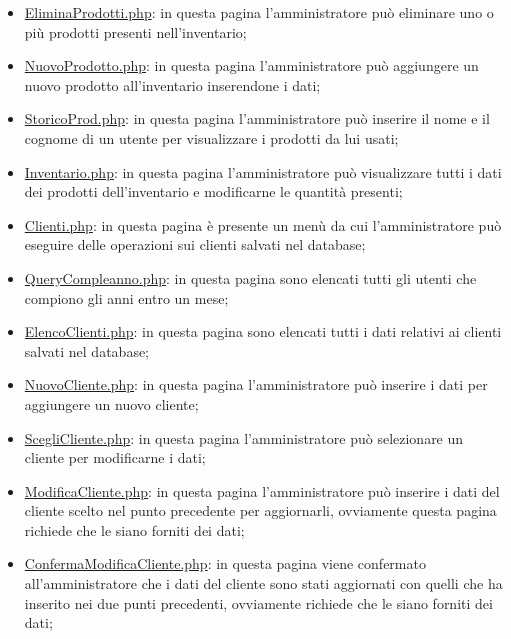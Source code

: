 {\begin{itemize}
		\item \href{http://tecweb2016.studenti.math.unipd.it/smarches/EliminaProdotti.php}{EliminaProdotti.php}: in questa pagina l'amministratore può eliminare uno o più prodotti presenti nell'inventario;
		\item \href{http://tecweb2016.studenti.math.unipd.it/smarches/NuovoProdotto.php}{NuovoProdotto.php}: in questa pagina l'amministratore può aggiungere un nuovo prodotto all'inventario inserendone i dati;
		\item \href{http://tecweb2016.studenti.math.unipd.it/smarches/StoricoProd.php}{StoricoProd.php}: in questa pagina l'amministratore può inserire il nome e il cognome di un utente per visualizzare i prodotti da lui usati;
		\item \href{http://tecweb2016.studenti.math.unipd.it/smarches/Inventario.php}{Inventario.php}: in questa pagina l'amministratore può visualizzare tutti i dati dei prodotti dell'inventario e modificarne le quantità presenti;
		\item \href{http://tecweb2016.studenti.math.unipd.it/smarches/Clienti.php}{Clienti.php}: in questa pagina è presente un menù da cui l'amministratore può eseguire delle operazioni sui clienti salvati nel database;
		\item \href{http://tecweb2016.studenti.math.unipd.it/smarches/QueryCompleanno.php}{QueryCompleanno.php}: in questa pagina sono elencati tutti gli utenti che compiono gli anni entro un mese;
		\item \href{http://tecweb2016.studenti.math.unipd.it/smarches/ElencoClienti.php}{ElencoClienti.php}: in questa pagina sono elencati tutti i dati relativi ai clienti salvati nel database;
		\item \href{http://tecweb2016.studenti.math.unipd.it/smarches/NuovoCliente.php}{NuovoCliente.php}: in questa pagina l'amministratore può inserire i dati per aggiungere un nuovo cliente;
		\item \href{http://tecweb2016.studenti.math.unipd.it/smarches/ScegliCliente.php}{ScegliCliente.php}: in questa pagina l'amministratore può selezionare un cliente per modificarne i dati;
		\item \underline{ModificaCliente.php}: in questa pagina l'amministratore può inserire i dati del cliente scelto nel punto precedente per aggiornarli, ovviamente questa pagina richiede che le siano forniti dei dati;
		\item \underline{ConfermaModificaCliente.php}: in questa pagina viene confermato all'amministratore che i dati del cliente sono stati aggiornati con quelli che ha inserito nei due punti precedenti, ovviamente richiede che le siano forniti dei dati;

\end{itemize}}

